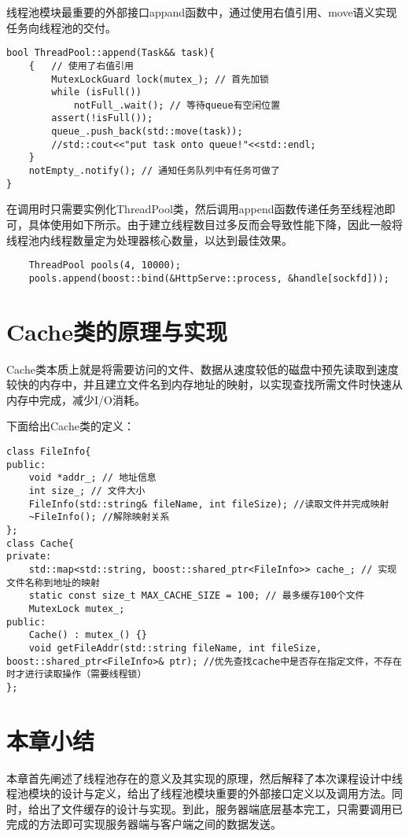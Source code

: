 \documentclass[bachelor]{thesis-uestc}
\begin{document}
线程池模块最重要的外部接口appand函数中，通过使用右值引用、move语义实现任务向线程池的交付。
\begin{lstlisting}
bool ThreadPool::append(Task&& task){
	{   // 使用了右值引用
		MutexLockGuard lock(mutex_); // 首先加锁
		while (isFull())
			notFull_.wait(); // 等待queue有空闲位置
		assert(!isFull());
		queue_.push_back(std::move(task)); 
		//std::cout<<"put task onto queue!"<<std::endl;
	}
	notEmpty_.notify(); // 通知任务队列中有任务可做了
}
\end{lstlisting}

在调用时只需要实例化ThreadPool类，然后调用append函数传递任务至线程池即可，具体使用如下所示。由于建立线程数目过多反而会导致性能下降，因此一般将线程池内线程数量定为处理器核心数量，以达到最佳效果。

\begin{lstlisting}
	ThreadPool pools(4, 10000); 
	pools.append(boost::bind(&HttpServe::process, &handle[sockfd]));
\end{lstlisting}


\section{Cache类的原理与实现}

Cache类本质上就是将需要访问的文件、数据从速度较低的磁盘中预先读取到速度较快的内存中，并且建立文件名到内存地址的映射，以实现查找所需文件时快速从内存中完成，减少I/O消耗。

下面给出Cache类的定义：
\begin{lstlisting}
class FileInfo{
public:
	void *addr_; // 地址信息
	int size_; // 文件大小
	FileInfo(std::string& fileName, int fileSize); //读取文件并完成映射
	~FileInfo(); //解除映射关系
};
class Cache{
private:
	std::map<std::string, boost::shared_ptr<FileInfo>> cache_; // 实现文件名称到地址的映射
	static const size_t MAX_CACHE_SIZE = 100; // 最多缓存100个文件
	MutexLock mutex_;
public:
	Cache() : mutex_() {}
	void getFileAddr(std::string fileName, int fileSize, boost::shared_ptr<FileInfo>& ptr); //优先查找cache中是否存在指定文件，不存在时才进行读取操作（需要线程锁）
};
\end{lstlisting}


\section{本章小结}

本章首先阐述了线程池存在的意义及其实现的原理，然后解释了本次课程设计中线程池模块的设计与定义，给出了线程池模块重要的外部接口定义以及调用方法。同时，给出了文件缓存的设计与实现。到此，服务器端底层基本完工，只需要调用已完成的方法即可实现服务器端与客户端之间的数据发送。
\end{document}
